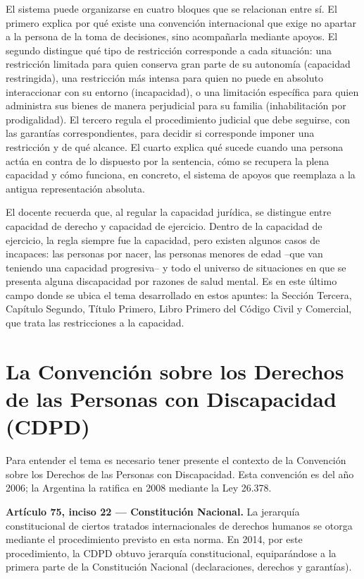 \documentclass[12pt,oneside]{book}
\begin{document}
\begin{note}
El sistema puede organizarse en cuatro bloques que se relacionan entre sí. El primero explica por qué existe una convención internacional que exige no apartar a la persona de la toma de decisiones, sino acompañarla mediante apoyos. El segundo distingue qué tipo de restricción corresponde a cada situación: una restricción limitada para quien conserva gran parte de su autonomía (capacidad restringida), una restricción más intensa para quien no puede en absoluto interaccionar con su entorno (incapacidad), o una limitación específica para quien administra sus bienes de manera perjudicial para su familia (inhabilitación por prodigalidad). El tercero regula el procedimiento judicial que debe seguirse, con las garantías correspondientes, para decidir si corresponde imponer una restricción y de qué alcance. El cuarto explica qué sucede cuando una persona actúa en contra de lo dispuesto por la sentencia, cómo se recupera la plena capacidad y cómo funciona, en concreto, el sistema de apoyos que reemplaza a la antigua representación absoluta.
\end{note}

El docente recuerda que, al regular la capacidad jurídica, se distingue entre capacidad de derecho y capacidad de ejercicio. Dentro de la capacidad de ejercicio, la regla siempre fue la capacidad, pero existen algunos casos de incapaces: las personas por nacer, las personas menores de edad --que van teniendo una capacidad progresiva-- y todo el universo de situaciones en que se presenta alguna discapacidad por razones de salud mental. Es en este último campo donde se ubica el tema desarrollado en estos apuntes: la Sección Tercera, Capítulo Segundo, Título Primero, Libro Primero del Código Civil y Comercial, que trata las restricciones a la capacidad.

\section{La Convención sobre los Derechos de las Personas con Discapacidad (CDPD)}

Para entender el tema es necesario tener presente el contexto de la Convención sobre los Derechos de las Personas con Discapacidad. Esta convención es del año 2006; la Argentina la ratifica en 2008 mediante la Ley 26.378.

\begin{important}
\textbf{Artículo 75, inciso 22 --- Constitución Nacional.} La jerarquía constitucional de ciertos tratados internacionales de derechos humanos se otorga mediante el procedimiento previsto en esta norma. En 2014, por este procedimiento, la CDPD obtuvo jerarquía constitucional, equiparándose a la primera parte de la Constitución Nacional (declaraciones, derechos y garantías).
\end{important}
\end{document}
